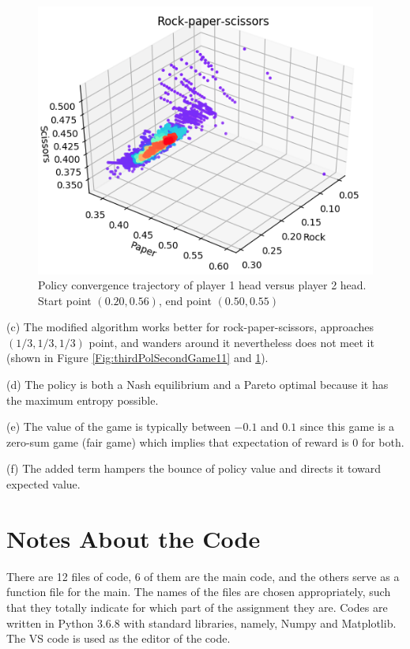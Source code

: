 \documentclass[journal]{IEEEtran}
\begin{document}
\begin{figure}[!t]

\centering
\includegraphics[scale=0.37]{figure/thirdGameSecondPolicy2m.png}
\caption{Policy convergence trajectory of player 1 head versus player 2 head. Start point $(0.20, 0.56)$, end point $(0.50, 0.55)$}
\label{Fig:thirdPolSecondGame12}
\end{figure}

(c) The modified algorithm works better for rock-paper-scissors, approaches $(1/3, 1/3, 1/3)$ point, and wanders around it nevertheless does not meet it \cite{the} (shown in Figure \ref{Fig:thirdPolSecondGame11} and \ref{Fig:thirdPolSecondGame12}).

(d) The policy is both a Nash equilibrium and a Pareto optimal because it has the maximum entropy possible.

(e) The value of the game is typically between $-0.1$ and $0.1$ since this game is a zero-sum game (fair game) which implies that expectation of reward is 0 for both.

(f) The added term hampers the bounce of policy value and directs it toward expected value.

\section{Notes About the Code}

There are 12 files of code, 6 of them are the main code, and the others serve as a function file for the main. The names of the files are chosen appropriately, such that they totally indicate for which part of the assignment they are. Codes are written in Python 3.6.8 with standard libraries, namely, Numpy and Matplotlib. The VS code is used as the editor of the code.



\end{document}
